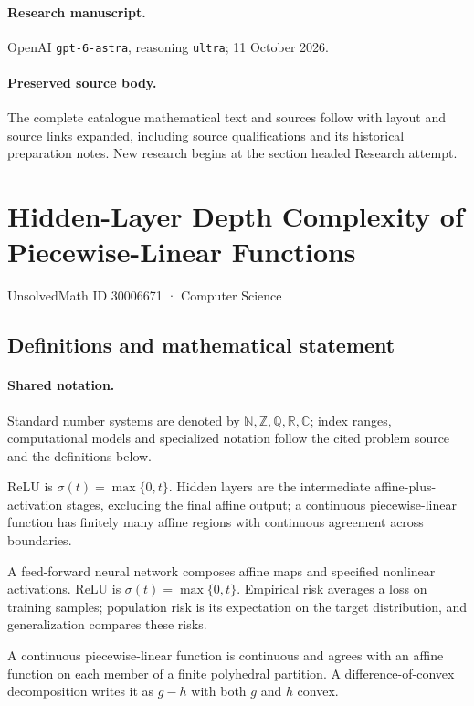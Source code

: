 \documentclass[11pt]{article}
\begin{document}
\paragraph{Research manuscript.} OpenAI \texttt{gpt-6-astra}, reasoning \texttt{ultra}; 11 October 2026.
\paragraph{Preserved source body.} The complete catalogue mathematical text and sources follow with layout and source links expanded, including source qualifications and its historical preparation notes. New research begins at the section headed Research attempt.

\section{Hidden-Layer Depth Complexity of Piecewise-Linear Functions}\label{30006671}
{\small UnsolvedMath ID 30006671 · Computer Science}
\subsection{Definitions and mathematical statement}

\paragraph{Shared notation.}Standard number systems are denoted by $\mathbb N,\mathbb Z,\mathbb Q,\mathbb R,\mathbb C$; index ranges, computational models and specialized notation follow the cited problem source and the definitions below.


ReLU is $\sigma(t)=\max\{0,t\}$. Hidden layers are the intermediate affine-plus-activation stages, excluding the final affine output; a continuous piecewise-linear function has finitely many affine regions with continuous agreement across boundaries.

A feed-forward neural network composes affine maps and specified nonlinear activations. ReLU is $\sigma(t)=\max\{0,t\}$. Empirical risk averages a loss on training samples; population risk is its expectation on the target distribution, and generalization compares these risks.

A continuous piecewise-linear function is continuous and agrees with an affine function on each member of a finite polyhedral partition. A difference-of-convex decomposition writes it as $g-h$ with both $g$ and $h$ convex.
\end{document}
